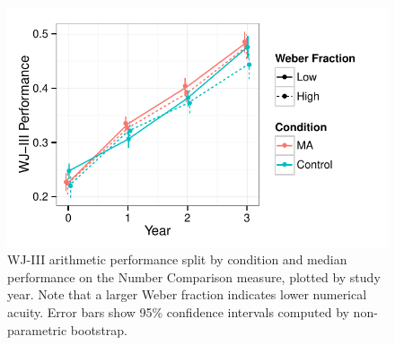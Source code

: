 \documentclass[11pt]{article}
\begin{document}
\begin{figure}
\begin{center}
\includegraphics[width=4.5in]{figures/wj_by_ans.pdf}
\end{center}
\caption{WJ-III arithmetic performance split by condition and median performance on the Number Comparison measure, plotted by study year. Note that a larger Weber fraction indicates lower numerical acuity. Error bars show 95\% confidence intervals computed by non-parametric bootstrap.}
\label{fig:wj3ans}
\end{figure}


\newpage


 
\end{document}
